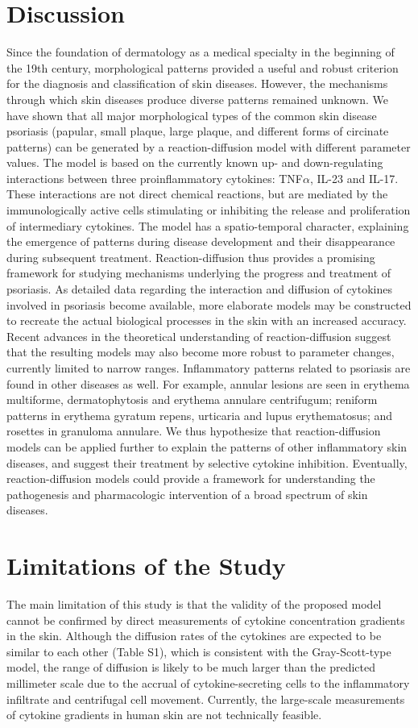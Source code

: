 \section{Discussion}
Since the foundation of dermatology as a medical specialty in the beginning of the 19th century, morphological patterns provided a useful and robust criterion for the diagnosis and classification of skin diseases. However, the mechanisms through which skin diseases produce diverse patterns remained unknown. We have shown that all major morphological types of the common skin disease psoriasis (papular, small plaque, large plaque, and different forms of circinate patterns) can be generated by a reaction-diffusion model with different parameter values. The model is based on the currently known up- and down-regulating interactions between three proinflammatory cytokines: TNF$\alpha$, IL-23 and IL-17. These interactions are not direct chemical reactions, but are mediated by the immunologically active cells stimulating or inhibiting the release and proliferation of intermediary cytokines. The model has a spatio-temporal character, explaining the emergence of patterns during disease development and their disappearance during subsequent treatment. Reaction-diffusion thus provides a promising framework for studying mechanisms underlying the progress and treatment of psoriasis. As detailed data regarding the interaction and diffusion of cytokines involved in psoriasis become available, more elaborate models may be constructed to recreate the actual biological processes in the skin with an increased accuracy. Recent advances in the theoretical understanding of reaction-diffusion \citep{diego2018} suggest that the resulting models may also become more robust to parameter changes, currently limited to narrow ranges. Inflammatory patterns related to psoriasis are found in other diseases as well. For example, annular lesions are seen in erythema multiforme, dermatophytosis and erythema annulare centrifugum; reniform patterns in erythema gyratum repens, urticaria and lupus erythematosus; and rosettes in granuloma annulare. We thus hypothesize that reaction-diffusion models can be applied further to explain the patterns of other inflammatory skin diseases, and suggest their treatment by selective cytokine inhibition. Eventually, reaction-diffusion models could provide a framework for understanding the pathogenesis and pharmacologic intervention of a broad spectrum of skin diseases. 

\section{Limitations of the Study}
The main limitation of this study is that the validity of the proposed model cannot be confirmed by direct measurements of cytokine concentration gradients in the skin. Although the diffusion rates of the cytokines are expected to be similar to each other (Table S1), which is consistent with the Gray-Scott-type model, the range of diffusion is likely to be much larger than the predicted millimeter scale due to the accrual of cytokine-secreting cells to the inflammatory infiltrate and centrifugal cell movement. Currently, the large-scale measurements of cytokine gradients in human skin are not technically feasible. 

